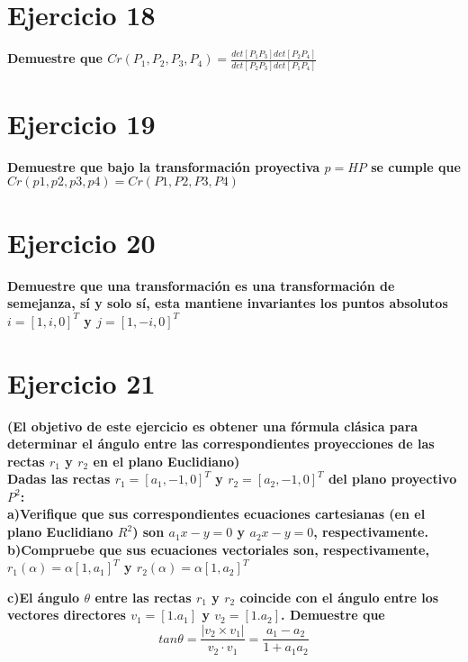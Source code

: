 \documentclass[12pt]{article}
\begin{document}
\section{Ejercicio 18}

\textbf{
Demuestre que 
$Cr(P_{1},P_{2},P_{3},P_{4})= \frac{ det[P_{1}P_{3}]det[P_{2}P_{4}] }{ det[P_{2}P_{3}]det[P_{1}P_{4}]   }$
}
\\


\section{Ejercicio 19}
\textbf{
Demuestre que bajo la transformación proyectiva $p =HP$ se cumple que $Cr(p1,p2,p3,p4) = Cr(P1,P2,P3,P4)$
}
\\


\section{Ejercicio 20}
\textbf{
Demuestre que una transformación es una transformación de semejanza, sí y solo sí, esta
mantiene invariantes los puntos absolutos $i=[1,i,0]^{T}$ y $j=[1,-i,0]^{T}$
}
\\



\section{Ejercicio 21}
\textbf{(El objetivo de este ejercicio es obtener una fórmula clásica para determinar el ángulo entre las correspondientes proyecciones de las rectas $r_{1}$ y $r_{2}$ en el plano Euclidiano)
\\
Dadas las rectas  $r_{1}=[a_{1}, -1, 0]^{T}$ y $r_{2}=[a_{2}, -1, 0]^{T}$ del plano proyectivo $P^{2}$:
}
\\

\textbf{
a)Verifique que sus correspondientes ecuaciones cartesianas (en el plano Euclidiano $R^{2}$) son  $a_{1}x -y =0$ y  $a_{2}x -y =0$, respectivamente.
}
\\


\textbf{
b)Compruebe que sus ecuaciones vectoriales son, respectivamente, $r_{1}(\alpha)=\alpha[1, a_{1}]^{T}$ y $r_{2}(\alpha)=\alpha[1, a_{2}]^{T}$
}


\textbf{
c)El ángulo $\theta$ entre las rectas $r_{1}$ y $r_{2}$ coincide con el ángulo entre los
vectores directores $v_{1} = [1. a_{1}]$ y $v_{2} = [1. a_{2}]$. Demuestre que
$$tan\theta = \frac{|v_{2} \times v_{1} |}{v_{2} \cdot v_{1}} = \frac{a_{1} - a_{2}}{1+a_{1}a_{2}}$$
}
\end{document}
